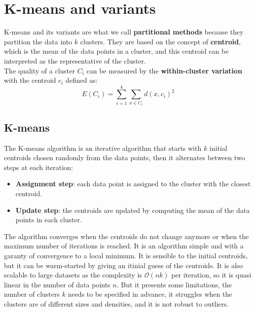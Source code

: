 \documentclass[12pt, openany]{report}
\theoremstyle{definition}
\begin{document}
\section{K-means and variants}
K-means and its variants are what we call \textbf{partitional methods} because they partition the data into $k$ clusters. They are based on the concept of \textbf{centroid}, which is the mean of the data points in a cluster, and this centroid can be interpreted as the representative of the cluster.\\
The quality of a cluster $C_i$ can be measured by the \textbf{within-cluster variation} with the centroid $c_i$ defined as:
\begin{equation}
    E(C_i) = \sum_{i=1}^{k}\sum_{x \in C_i} d(x, c_i)^2
\end{equation}
\subsection{K-means}
The K-means algorithm is an iterative algorithm that starts with $k$ initial centroids chosen randomly from the data points, then it alternates between two steps at each iteration:
\begin{itemize}
    \item \textbf{Assignment step}: each data point is assigned to the cluster with the closest centroid.
    \item \textbf{Update step}: the centroids are updated by computing the mean of the data points in each cluster.
\end{itemize}
The algorithm converges when the centroids do not change anymore or when the maximum number of iterations is reached. It is an algorithm simple and with a garanty of convergence to a local minimum. It is sensible to the initial centroids, but it can be warm-started by giving an itinial guess of the centroids. It is also scalable to large datasets as the complexity is $\mathcal{O}(nk)$ per iteration, so it is quasi linear in the number of data points $n$. But it presents some limitations, the number of clusters $k$ needs to be specified in advance, it struggles when the clusters are of different sizes and densities, and it is not robust to outliers.
\end{document}
